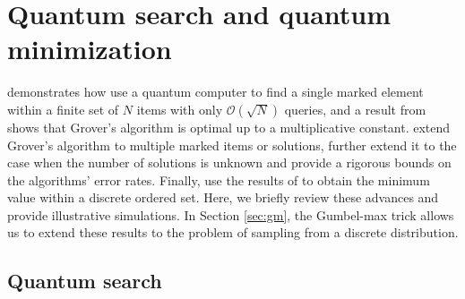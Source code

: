 \documentclass[12pt]{article} %
\DeclarePairedDelimiter{\ceil}{\lceil}{\rceil}
\begin{document}
\section{Quantum search and quantum minimization}\label{sec:searchAndMin}

\citet{grover1996fast} demonstrates how use a quantum computer to find a single marked element within a finite set of $N$ items with only $\mathcal{O}(\sqrt{N})$ queries, and a result from \citet{bennett1997strengths} shows that Grover's algorithm is optimal up to a multiplicative constant. \citet{boyer1998tight} extend Grover's algorithm to multiple marked items or solutions, further extend it to the case when the number of solutions is unknown and provide a rigorous bounds on the algorithms' error rates.  Finally, \citet{durr1996quantum} use the results of \citet{boyer1998tight} to obtain the minimum value within a discrete ordered set.  Here, we briefly review these advances and provide illustrative simulations.  In Section \ref{sec:gm}, the Gumbel-max trick allows us to extend these results to the problem of sampling from a discrete distribution.

\subsection{Quantum search}\label{sec:qSearch}

\begin{figure}[!t]
	\centering
\end{figure}
\end{document}
